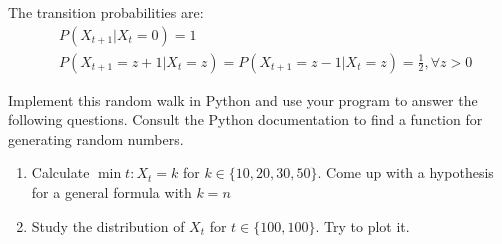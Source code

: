 \documentclass[a4paper,11pt]{article}
\begin{document}
\begin{description}
The transition probabilities are: 
\begin{align*}
&P(X_{t+1} | X_t = 0) = 1 \\
&P(X_{t+1} = z+1 | X_t = z) = P(X_{t+1} = z-1 | X_t = z) = \frac{1}{2}, \forall z > 0
\end{align*}

Implement this random walk in Python and use your program to answer the following questions. Consult the Python documentation to find a function for generating random numbers.

\begin{enumerate}
\item Calculate $\min{t: X_t = k}$ for $k \in \{10,20,30,50\}$. Come up with a hypothesis for a general formula with $k=n$
\item Study the distribution of $X_t$ for $t \in \{100, 100\}$. Try to plot it.
\end{enumerate}

\end{description}
\end{document}
